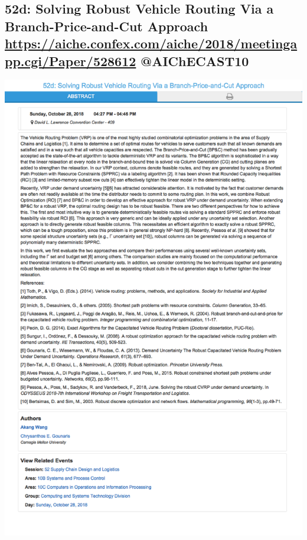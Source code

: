 \documentclass[11pt]{article}
\begin{document}
\subsection{52d: Solving Robust Vehicle Routing Via a Branch-Price-and-Cut Approach \url{https://aiche.confex.com/aiche/2018/meetingapp.cgi/Paper/528612} @AIChECAST10}
\label{sec:org9623344}
\begin{center}
\includegraphics[width=.9\linewidth]{./528612.png}
\end{center}
\end{document}
